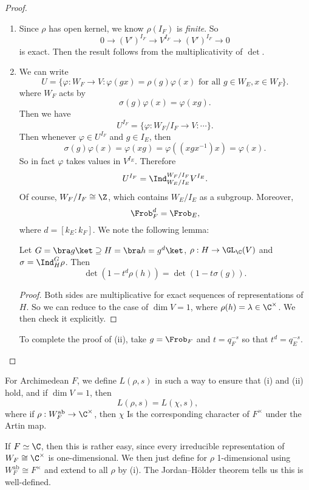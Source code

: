 \documentclass[a4paper]{article}
\newcommand\ab{\mathrm{ab}}
\begin{document}
\begin{proof}\leavevmode
  \begin{enumerate}
    \item Since $\rho$ has open kernel, we know $\rho(I_F)$ is \emph{finite}. So
      \[
        0 \to (V')^{I_F} \to V^{I_F} \to (V')^{I_F} \to 0
      \]
      is exact. Then the result follows from the multiplicativity of $\det$.
    \item We can write
      \[
        U = \{\varphi: W_F \to V : \varphi(gx) = \rho(g) \varphi(x)\text{ for all }g \in W_E, x \in W_F\}.
      \]
      where $W_F$ acts by
      \[
        \sigma(g)\varphi(x) = \varphi(xg).
      \]
      Then we have
      \[
        U^{I_F} = \{\varphi: W_F/I_F \to V : \cdots\}.
      \]
      Then whenever $\varphi \in U^{I_F}$ and $g \in I_E$, then
      \[
        \sigma(g) \varphi(x) = \varphi(xg) = \varphi((xgx^{-1})x) = \varphi(x).
      \]
      So in fact $\varphi$ takes values in $V^{I_E}$. Therefore
      \[
        U^{I_F} = \Ind_{W_E/I_E}^{W_F/I_F} V^{I_E}.
      \]
      Of course, $W_F /I_F \cong \Z$, which contains $W_E/I_E$ as a subgroup. Moreover,
      \[
        \Frob_F^d = \Frob_E,
      \]
      where $d = [k_E:k_F]$. We note the following lemma:
      \begin{lemma}
        Let $G = \bra g\ket \supseteq H = \bra h = g^d\ket$, $\rho: H \to \GL_\C(V)$ and $\sigma = \Ind_H^G \rho$. Then
        \[
          \det (1 - t^d \rho(h)) = \det (1 - t \sigma(g)).
        \]
      \end{lemma}
      \begin{proof}
        Both sides are multiplicative for exact sequences of representations of $H$. So we can reduce to the case of $\dim V = 1$, where $\rho(h) = \lambda \in \C^\times$. We then check it explicitly.
      \end{proof}
      To complete the proof of (ii), take $g = \Frob_F$ and $t = q_F^{-s}$ so that $t^d = q_E^{-s}$.\qedhere
  \end{enumerate}
\end{proof}

For Archimedean $F$, we define $L(\rho, s)$ in such a way to ensure that (i) and (ii) hold, and if $\dim V = 1$, then
\[
  L(\rho, s) = L(\chi, s),
\]
where if $\rho: W_{F}^\ab \to \C^\times$, then $\chi$ Is the corresponding character of $F^\times$ under the Artin map.

If $F \simeq \C$, then this is rather easy, since every irreducible representation of $W_F \cong \C^\times$ is one-dimensional. We then just define for $\rho$ 1-dimensional using $W_F^\ab \cong F^{\times}$ and extend to all $\rho$ by (i). The Jordan--H\"older theorem tells us this is well-defined.
\end{document}
